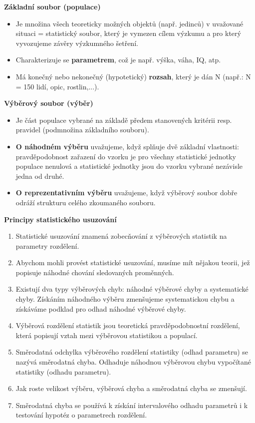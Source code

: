 \textbf{Základní soubor (populace)}
\begin{itemize}
	\item Je množina všech teoreticky možných objektů (např. jedinců) v uvažované situaci = statistický soubor, který je vymezen cílem výzkumu a pro který vyvozujeme závěry výzkumného šetření.
	\item Charakterizuje se \textbf{parametrem}, což je např. výška, váha, IQ, atp.
	\item Má konečný nebo nekonečný (hypotetický) \textbf{rozsah}, který je dán N (např.: N = 150 lidí, opic, rostlin,...).
\end{itemize}
\textbf{Výběrový soubor (výběr)}
\begin{itemize}
	\item Je část populace vybrané na základě předem stanovených kritérii resp. pravidel (podmnožina základního souboru).
	\item \textbf{O náhodném výběru} uvažujeme, když splňuje dvě základní vlastnosti: pravděpodobnost zařazení do vzorku je pro všechny statistické jednotky populace nenulová a statistické jednotky jsou do vzorku vybrané nezávisle jedna od druhé.
	\item \textbf{O reprezentativním výběru} uvažujeme, když výběrový soubor dobře odráží strukturu celého zkoumaného souboru.
\end{itemize}
\textbf{Principy statistického usuzování}
\begin{enumerate}
	\item Statistické usuzování znamená zobecňování z výběrových statistik na parametry rozdělení.
	\item Abychom mohli provést statistické usuzování, musíme mít nějakou teorii, jež popisuje náhodné chování sledovaných proměnných.
	\item Existují dva typy výběrových chyb: náhodné výběrové chyby a systematické chyby. Získáním náhodného výběru zmenšujeme systematickou chybu a získáváme podklad pro odhad náhodné výběrové chyby.
	\item Výběrová rozdělení statistik jsou teoretická pravděpodobnostní rozdělení, která popisují vztah mezi výběrovou statistikou a populací.
	\item Směrodatná odchylka výběrového rozdělení statistiky (odhad parametru) se nazývá směrodatná chyba. Odhaduje náhodnou výběrovou chybu vypočítané statistiky (odhadu parametru).
	\item Jak roste velikost výběru, výběrová chyba a směrodatná chyba se zmenšují.
	\item Směrodatná chyba se používá k získání intervalového odhadu parametrů i k testování hypotéz o parametrech rozdělení.
\end{enumerate}
